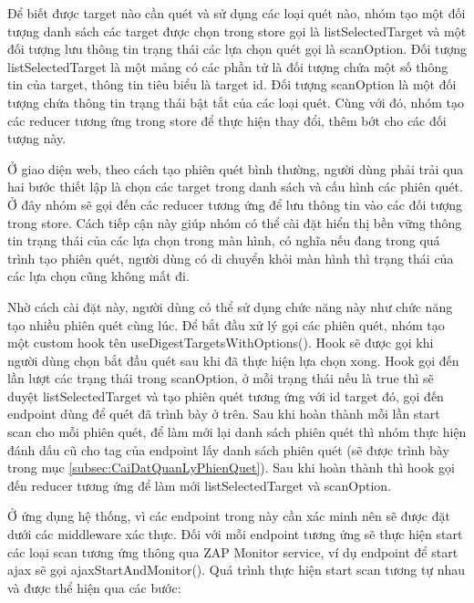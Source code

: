 Để biết được target nào cần quét và sử dụng các loại quét nào, nhóm tạo một đối tượng danh sách các target được chọn trong store gọi là listSelectedTarget và một đối tượng lưu thông tin trạng thái các lựa chọn quét gọi là scanOption. Đối tượng listSelectedTarget là một mảng có các phần tử là đối tượng chứa một số thông tin của target, thông tin tiêu biểu là target id. Đối tượng scanOption là một đối tượng chứa thông tin trạng thái bật tắt của các loại quét. Cùng với đó, nhóm tạo các reducer tương ứng trong store để thực hiện thay đổi, thêm bớt cho các đối tượng này.

Ở giao diện web, theo cách tạo phiên quét bình thường, người dùng phải trải qua hai bước thiết lập là chọn các target trong danh sách và cấu hình các phiên quét.
Ở đây nhóm sẽ gọi đến các reducer tương ứng để lưu thông tin vào các đối tượng trong store. Cách tiếp cận này giúp nhóm có thể cài đặt hiển thị bền vững thông tin trạng thái của các lựa chọn trong màn hình, có nghĩa nếu đang trong quá trình tạo phiên quét, người dùng có di chuyển khỏi màn hình thì trạng thái của các lựa chọn cũng không mất đi.

Nhờ cách cài đặt này, người dùng có thể sử dụng chức năng này như chức năng tạo nhiều phiên quét cùng lúc.
Để bắt đầu xử lý gọi các phiên quét, nhóm tạo một custom hook tên useDigestTargetsWithOptions().
Hook sẽ được gọi khi người dùng chọn bắt đầu quét sau khi đã thực hiện lựa chọn xong.
Hook gọi đến lần lượt các trạng thái trong scanOption, ở mỗi trạng thái nếu là true thì sẽ duyệt listSelectedTarget và tạo phiên quét tương ứng với id target đó, gọi đến endpoint dùng để quét đã trình bày ở trên.
Sau khi hoàn thành mỗi lần start scan cho mỗi phiên quét, để làm mới lại danh sách phiên quét thì nhóm thực hiện đánh dấu cũ cho tag của endpoint lấy danh sách phiên quét (sẽ được trình bày trong mục \ref{subsec:CaiDatQuanLyPhienQuet}).
Sau khi hoàn thành thì hook gọi đến reducer tương ứng để làm mới listSelectedTarget và scanOption.

Ở ứng dụng hệ thống, vì các endpoint trong này cần xác minh nên sẽ được đặt dưới các middleware xác thực.
Đối với mỗi endpoint tương ứng sẽ thực hiện start các loại scan tương ứng thông qua ZAP Monitor service, ví dụ endpoint để start ajax sẽ gọi ajaxStartAndMonitor().
Quá trình thực hiện start scan tương tự nhau và được thể hiện qua các bước:

